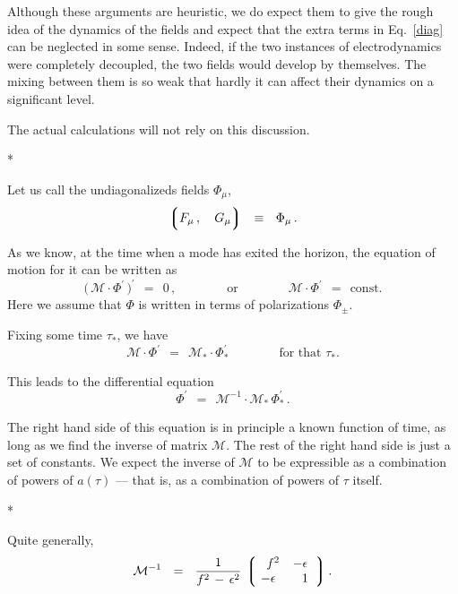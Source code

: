 \documentclass[12pt]{article}
\def\beq{\begin{equation}}
\def\eeq{\end{equation}}
\newcommand{\mc}[1]{\mathcal{#1}}
\newcommand{\ph}{\phantom}
\newcommand{\lgr}{\left\lgroup}
\newcommand{\rgr}{\right\rgroup}
\begin{document}
	Although these arguments are heuristic, we do expect them to give the rough idea 
	of the dynamics of the fields and expect that the extra terms in Eq.~\eqref{diag} can be neglected in some sense.
	Indeed, if the two instances of electrodynamics were completely decoupled, 
	the two fields would develop by themselves. 
	The mixing between them is so weak that hardly it can affect their dynamics on a significant level.

	The actual calculations will not rely on this discussion.


\vspace{1.0cm}
\centerline{*\qquad\qquad\qquad*\qquad\qquad\qquad*}
\vspace{1.0cm}

	
	Let us call the undiagonalizeds fields $ \Phi_\mu $,
\beq
	\lgr  F_\mu\,, \quad G_\mu  \rgr    ~~\equiv~~    \Phi_\mu\,.
\eeq


	As we know, at the time when a mode has exited the horizon, the equation of motion for
	it can be written as
\beq
	\big(\, \mc{M} \cdot \Phi^\prime \,\big)^\prime    ~~=~~    0\,,
	\qquad\qquad
	\text{or}
	\qquad\qquad
	\mc{M} \cdot \Phi^\prime    ~~=~~    \text{const}.
\eeq
	Here we assume that $ \Phi $ is written in terms of polarizations $ \Phi_{\pm} $.

	Fixing some time $ \tau_* $, we have
\beq
	\mc{M} \cdot \Phi^\prime    ~~=~~    \mc{M}_* \cdot \Phi_*^\prime
	\qquad\qquad
	\text{for that $\tau_*$}.
\eeq

	This leads to the differential equation
\beq
\label{diffeq}
	\Phi^\prime  ~~=~~ \mc{M}^{-1} \cdot \mc{M}_*\, \Phi_*^\prime\,.
\eeq

	The right hand side of this equation is in principle a known function of time, as long as
	we find the inverse of matrix $ \mc{M} $.
	The rest of the right hand side is just a set of constants.
	We expect the inverse of $ \mc{M} $ to be expressible as a combination of powers
	of $ a(\tau) $ --- that is, as a combination of powers of $ \tau $ itself.


\vspace{1.0cm}
\centerline{*\qquad\qquad\qquad*\qquad\qquad\qquad*}
\vspace{1.0cm}

	
	Quite generally,
\beq
\label{invM}
	\mc{M}^{-1}   ~~=~~    \frac{1}{f^2 \,-\, \epsilon^2}\,
					\lgr \begin{matrix}
						\ph{-} f^2    &    -\epsilon    \\
						-\epsilon   &    \ph- 1
					\end{matrix} \;\; \rgr  .
\eeq
	
\end{document}
